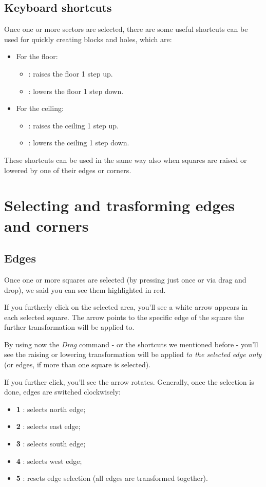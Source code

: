 \section{Keyboard shortcuts}
Once one or more sectors are selected, there are some useful shortcuts can be used for quickly creating blocks and holes, which are:
\begin{itemize}
    \item For the floor:
    \begin{itemize}
        \item {}: raises the floor 1 step up.
        \item {}: lowers the floor 1 step down.
    \end{itemize}
    \item For the ceiling:
    \begin{itemize}
        \item {}: raises the ceiling 1 step up.
        \item {}: lowers the ceiling 1 step down.
    \end{itemize}
\end{itemize}

These shortcuts can be used in the same way also when squares are raised or lowered by one of their edges or corners.

\chapter{Selecting and trasforming edges and corners}

\section{Edges}

Once one or more squares are selected (by pressing  just once or via drag and drop), we said you can see them highlighted in red.
\par If you furtherly click on the selected area, you'll see a white arrow appears in each selected square. The arrow points to the specific edge of the square the further transformation will be applied to.
\par By using now the \emph{Drag} command - or the shortcuts  we mentioned before - you'll see the raising or lowering transformation will be applied \emph{to the selected edge only} (or edges, if more than one square is selected).

\par If you further click, you'll see the arrow rotates. Generally, once the selection is done, edges are switched clockwisely:
\begin{itemize}
    \item \textbf{1 }: selects north edge;
    \item \textbf{2 }: selects east edge;
    \item \textbf{3 }: selects south edge;
    \item \textbf{4 }: selects west edge;
    \item \textbf{5 }: resets edge selection (all edges are transformed together).
\end{itemize}

